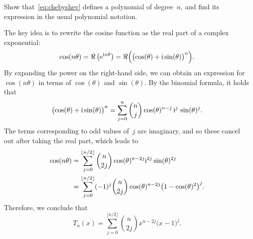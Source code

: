 \begin{exercise}
    \label{exercise:chebyshev}
    Show that~\eqref{eq:chebyshev} defines a polynomial of degree~$n$,
    and find its expression in the usual polynomial notation.
\end{exercise}
\begin{solution}
    The key idea is to rewrite the cosine function as the real part of a complex exponential:
    \[
        \cos (n \theta) = \Re \left( \mathrm e^{\mathrm i n \theta} \right)
            = \Re \Bigl( \bigl( \cos (\theta) + \mathrm i \sin (\theta) \bigr)^n \Bigr).
    \]
    By expanding the power on the right-hand side,
    we can obtain an expression for $\cos(n \theta)$ in terms of $\cos(\theta)$ and $\sin(\theta)$.
    By the binomial formula,
    it holds that
    \[
        \bigl( \cos (\theta) + \mathrm i \sin (\theta) \bigr)^n
        = \sum_{j=0}^{n} \binom{n}{j} \cos(\theta)^{n-j}  \, \mathrm i^{j} \, \sin(\theta)^{j}.
    \]
    The terms corresponding to odd values of~$j$ are imaginary,
    and so these cancel out after taking the real part,
    which leads to
    \begin{align*}
        \cos (n \theta)
        &= \sum_{j=0}^{\lfloor n/2 \rfloor} \binom{n}{2j} \cos(\theta)^{n-2j}  \mathrm i^{2j} \sin(\theta)^{2j} \\
        &= \sum_{j=0}^{\lfloor n/2 \rfloor} (-1)^j \binom{n}{2j} \cos(\theta)^{n-2j}   \bigl(1 - \cos(\theta)^2\bigr)^j.
    \end{align*}
    Therefore,
    we conclude that
    \begin{equation}
        \label{eq:expression_chebyshev}
        T_n(x) = \sum_{j=0}^{\lfloor n/2 \rfloor} \binom{n}{2j} x^{n-2j}   \bigl(x - 1\bigr)^j.
    \end{equation}
\end{solution}

